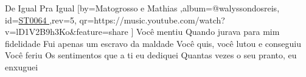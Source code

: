 \beginsong
{De Igual Pra Igual %
}[by={Matogrosso e Mathias %
},album={@walyssondosreis},
id={\href{https://music.youtube.com/watch?v=lD1V2B9h3Ko&feature=share %
}{ST0064 %
}},rev={5}, %
qr={https://music.youtube.com/watch?v=lD1V2B9h3Ko&feature=share %
}]
\beginverse
Você mentiu
Quando jurava para mim fidelidade
Fui apenas um escravo da maldade
Você quis, você lutou e conseguiu
\endverse
\beginverse
Você feriu
Os sentimentos que a ti eu dediquei
Quantas vezes o seu pranto, eu enxuguei
